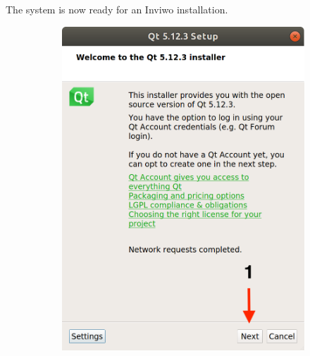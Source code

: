 The system is now ready for an Inviwo installation.

\begin{figure}[H]
    \centering
    \begin{subfigure}{0.32\linewidth}
        \includegraphics[width=1\textwidth]{images/Qt1.png}
    \end{subfigure}
    \begin{subfigure}{0.32\linewidth}

\end{subfigure}
\end{figure}
